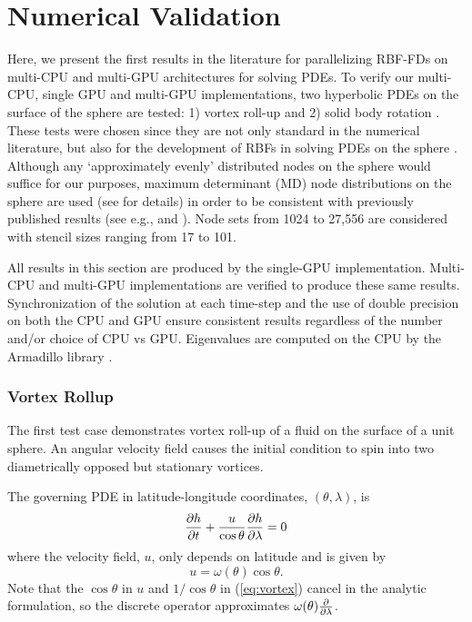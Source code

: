 
\chapter{Numerical Validation} 

\label{sec:validation}

Here, we present the first results in the literature for parallelizing RBF-FDs on multi-CPU and multi-GPU architectures for solving PDEs. 
 To verify our multi-CPU, single GPU and multi-GPU implementations, two hyperbolic PDEs on the surface of the sphere are tested: 1) vortex roll-up \cite{NairTransport05, NairJablonowski08} and 2) solid body rotation \cite{JakobChien1995}. These tests were chosen since they are not only standard in the numerical literature, but also
for the development of RBFs in solving PDEs on the sphere \cite{FlyerWright07, Fornberg2008, FlyerLehto10, Fornberg2011a}. Although any `approximately evenly' distributed nodes on the sphere would suffice for our purposes, maximum determinant (MD) node distributions on the sphere are used (see \cite{Sloan2003} for details) in order to be consistent with previously published results (see e.g., \cite{FlyerWright07} and \cite{FornbergLehto11}). Node sets from 1024 to 27,556 are considered with stencil sizes ranging from 17 to 101.

All results in this section are produced by the single-GPU implementation. Multi-CPU and multi-GPU implementations are verified to produce these same results. Synchronization of the solution at each time-step and the use of double precision on both the CPU and GPU ensure consistent results regardless of the number and/or choice of CPU vs GPU. Eigenvalues are computed on the CPU by the Armadillo library \cite{armadillo2010}.


\subsection{Vortex Rollup}
\label{sec:numerical_validation}
The first test case demonstrates vortex roll-up of a fluid on the surface of a unit sphere. An angular velocity field causes the initial condition to spin into two diametrically opposed but stationary vortices.

The governing PDE in latitude-longitude coordinates, $(\theta,\lambda)$, is
\begin{equation}
\frac{\partial h}{\partial t} + \frac{u}{\cos \theta} \frac{\partial h}{\partial \lambda} = 0
\label{eq:vortex}
\end{equation}
where the velocity field, $u$, only depends on latitude and is given by
\begin{equation*}
u  = \omega(\theta) \cos \theta.
\end{equation*}
Note that the $\cos \theta$ in $u$ and $1/\cos{\theta}$ in (\ref{eq:vortex}) cancel in the analytic formulation, so the discrete operator approximates $\omega(\theta) \frac{\partial }{\partial \lambda}$. 

